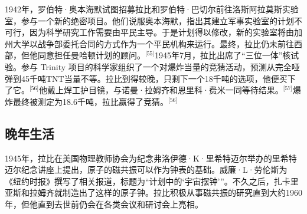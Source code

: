 1942年，罗伯特·奥本海默试图招募拉比和罗伯特·巴切尔前往洛斯阿拉莫斯实验室，参与一个新的绝密项目。他们说服奥本海默，指出其建立军事实验室的计划不可行，因为科学研究工作需要由平民主导。于是计划得以修改，新的实验室将由加州大学以战争部委托合同的方式作为一个平民机构来运行。最终，拉比仍未前往西部，但他同意担任曼哈顿计划的顾问。\(^\text{[55]}\)1945年7月，拉比出席了“三位一体”核试验。参与 Trinity 项目的科学家组织了一个对爆炸当量的竞猜活动，预测从完全哑弹到45千吨TNT当量不等。拉比到得较晚，只剩下一个18千吨的选项，他便买下了它。\(^\text{[56]}\)他戴上焊工护目镜，与诺曼·拉姆齐和恩里科·费米一同等待结果。\(^\text{[57]}\)爆炸最终被测定为18.6千吨，拉比赢得了竞猜。\(^\text{[56]}\)
\subsection{晚年生活}
1945年，拉比在美国物理教师协会为纪念弗洛伊德·K·里希特迈尔举办的里希特迈尔纪念讲座上提出，原子的磁共振可以作为钟表的基础。威廉·L·劳伦斯为《纽约时报》撰写了相关报道，标题为“计划中的‘宇宙摆钟’”。不久之后，扎卡里亚斯和拉姆齐就制造出了这样的原子钟。拉比积极从事磁共振的研究直到大约1960年，但他直到去世前仍会在各类会议和研讨会上亮相。
